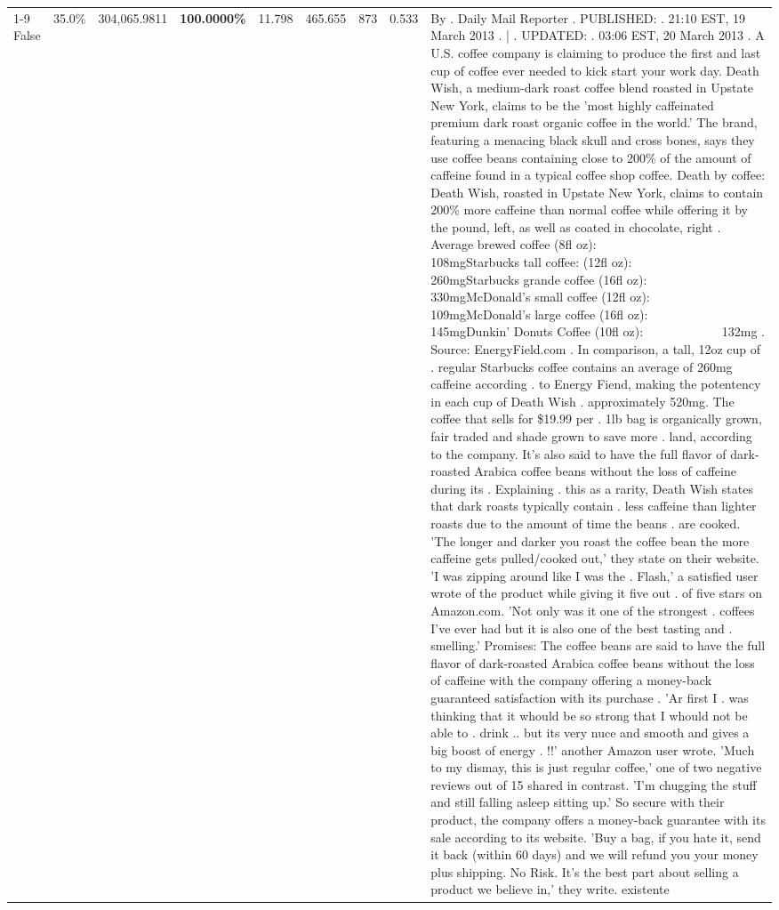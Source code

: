 \begin{table}[H]
{\begin{tabular}{lllrlllll}
\cline{1-9}
False & 35.0\% & 304,065.9811 & \bfseries \color{red} 100.0000\% & 11.798 & 465.655 & 873 & 0.533 & By . Daily Mail Reporter . PUBLISHED: . 21:10 EST, 19 March 2013 . | . UPDATED: . 03:06 EST, 20 March 2013 . A U.S. coffee company is claiming to produce the first and last cup of coffee ever needed to kick start your work day. Death Wish, a medium-dark roast coffee blend roasted in Upstate New York, claims to be the 'most highly caffeinated premium dark roast organic coffee in the world.' The brand, featuring a menacing black skull and cross bones, says they use coffee beans containing close to 200\% of the amount of caffeine found in a typical coffee shop coffee. Death by coffee: Death Wish, roasted in Upstate New York, claims to contain 200\% more caffeine than normal coffee while offering it by the pound, left, as well as coated in chocolate, right . Average brewed coffee (8fl oz):              108mgStarbucks tall coffee: (12fl oz):                260mgStarbucks grande coffee (16fl oz):         330mgMcDonald's small coffee (12fl oz):           109mgMcDonald's large coffee (16fl oz):           145mgDunkin' Donuts Coffee (10fl oz):             132mg . Source: EnergyField.com . In comparison, a tall, 12oz cup of . regular Starbucks coffee contains an average of 260mg caffeine according . to Energy Fiend, making the potentency in each cup of Death Wish . approximately 520mg. The coffee that sells for \$19.99 per . 1lb bag is organically grown, fair traded and shade grown to save more . land, according to the company. It's also said to have the full flavor of dark-roasted Arabica coffee beans without the loss of caffeine during its . Explaining . this as a rarity, Death Wish states that dark roasts typically contain . less caffeine than lighter roasts due to the amount of time the beans . are cooked. 'The longer and darker you roast the coffee bean the more caffeine gets pulled/cooked out,' they state on their website. 'I was zipping around like I was the . Flash,' a satisfied user wrote of the product while giving it five out . of five stars on Amazon.com. 'Not only was it one of the strongest . coffees I've ever had but it is also one of the best tasting and . smelling.’ Promises: The coffee beans are said to have the full flavor of dark-roasted Arabica coffee beans without the loss of caffeine with the company offering a money-back guaranteed satisfaction with its purchase . 'Ar first I . was thinking that it whould be so strong that I whould not be able to . drink .. but its very nuce and smooth and gives a big boost of energy . !!' another Amazon user wrote. 'Much to my dismay, this is just regular coffee,' one of two negative reviews out of 15 shared in contrast. 'I'm chugging the stuff and still falling asleep sitting up.' So secure with their product, the company offers a money-back guarantee with its sale according to its website. 'Buy a bag, if you hate it, send it back (within 60 days) and we will refund you your money plus shipping. No Risk. It’s the best part about selling a product we believe in,' they write. existente \\

\end{tabular}}
\end{table}
